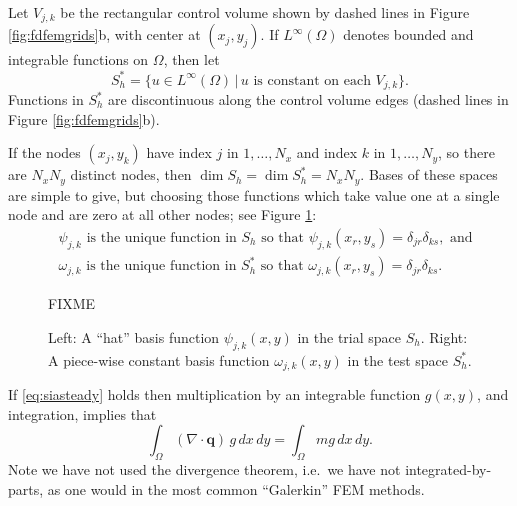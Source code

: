 \documentclass[11pt]{amsart}
\newcommand\bq{\mathbf{q}}
\newcommand{\Div}{\nabla\cdot}
\begin{document}
Let $V_{j,k}$ be the rectangular control volume shown by dashed lines in Figure \ref{fig:fdfemgrids}b, with center at $(x_j,y_j)$.  If $L^\infty(\Omega)$ denotes bounded and integrable functions on $\Omega$, then let
\begin{equation}
S_h^* = \{u \in L^\infty(\Omega) \,\big|\, u \text{ is constant on each $V_{j,k}$}\}.
\end{equation}
Functions in $S_h^*$ are discontinuous along the control volume edges (dashed lines in Figure \ref{fig:fdfemgrids}b).

If the nodes $(x_j,y_k)$ have index $j$ in $1,\dots,N_x$ and index $k$ in $1,\dots,N_y$, so there are $N_xN_y$ distinct nodes, then $\dim S_h = \dim S_h^* = N_x N_y$.  Bases of these spaces are simple to give, but choosing those functions which take value one at a single node and are zero at all other nodes; see Figure \ref{fig:fembases}:
\begin{align}
&\psi_{j,k} \text{ is the unique function in } S_h \text{ so that } \psi_{j,k}(x_r,y_s) = \delta_{jr} \delta_{ks}, \text{ and} \\
&\omega_{j,k} \text{ is the unique function in } S_h^* \text{ so that } \omega_{j,k}(x_r,y_s) = \delta_{jr} \delta_{ks}.
\end{align}

\begin{figure}[ht]
\begin{center}
FIXME
\end{center}
\caption{Left: A ``hat'' basis function $\psi_{j,k}(x,y)$ in the trial space $S_h$.  Right: A piece-wise constant basis function $\omega_{j,k}(x,y)$ in the test space $S_h^*$.}
\label{fig:fembases}
\end{figure}

If \eqref{eq:siasteady} holds then multiplication by an integrable function $g(x,y)$, and integration, implies that
\begin{equation}
  \int_\Omega (\Div \bq)\, g\,dx\,dy = \int_\Omega m g\,dx\,dy.  \label{eq:siaweak}
\end{equation}
Note we have not used the divergence theorem, i.e.~we have not integrated-by-parts, as one would in the most common ``Galerkin'' FEM methods.
\end{document}
